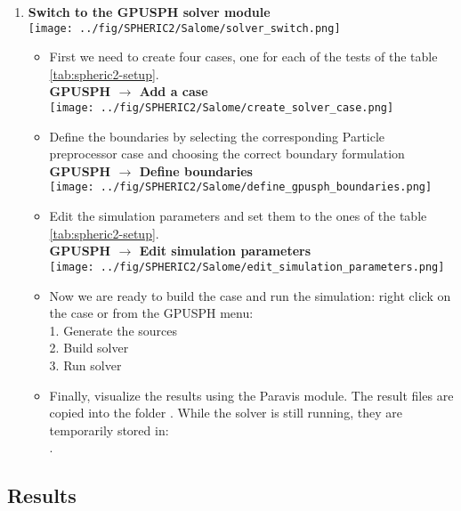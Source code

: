 \documentclass{../GPUSPHtemplate}
\begin{document}
\begin{enumerate}
\item \textbf{Switch to the GPUSPH solver module}  \smallskip\\
  \texttt{[image: ../fig/SPHERIC2/Salome/solver\_switch.png]}
  \begin{itemize}
  \item First we need to create four cases, one for each of the tests of the table \ref{tab:spheric2-setup}.\\
    \textbf{GPUSPH $\to$ Add a case}\smallskip\\
    \texttt{[image: ../fig/SPHERIC2/Salome/create\_solver\_case.png]}
  \item Define the boundaries by selecting the corresponding Particle preprocessor case and choosing the correct boundary formulation\\
    \textbf{GPUSPH $\to$ Define boundaries}\smallskip\\
    \texttt{[image: ../fig/SPHERIC2/Salome/define\_gpusph\_boundaries.png]}
  \item Edit the simulation parameters and set them to the ones of the table \ref{tab:spheric2-setup}.\\
    \textbf{GPUSPH $\to$ Edit simulation parameters}\smallskip\\
    \texttt{[image: ../fig/SPHERIC2/Salome/edit\_simulation\_parameters.png]}\medskip
  \item Now we are ready to build the case and run the simulation: right click on the case or from the GPUSPH menu:\\
    1. Generate the sources\\
    2. Build solver\\
    3. Run solver
  \item Finally, visualize the results using the Paravis module. The result files are copied into the folder
    . While the solver is still running, they are temporarily stored in:\\
    .
  \end{itemize}
\end{enumerate}

\subsection{Results}
\end{document}
